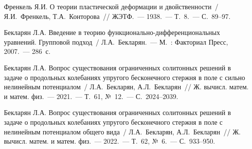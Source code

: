 \begin{thebibliography}{4} %
    
 Френкель Я.И. О теории пластической деформации и двойственности~/ Я.И.~Френкель, Т.А.~Конторова~// ЖЭТФ.~--- 1938.~--- Т.~8.~--- С.~89--97.

Бекларян Л.А. Введение в теорию функ\-ци\-о\-наль\-но-диф\-фе\-рен\-ци\-о\-наль\-ных уравнений. Групповой подход~/ Л.А.~Бекларян.~--- М.~: Факториал Пресс, 2007.~--- 286~с.

Бекларян Л.А. Вопрос существования ограниченных солитонных решений в задаче о продольных колебаниях упругого бесконечного стержня в поле с сильно нелинейным потенциалом~/ Л.А.~Бекларян, А.Л.~Бекларян~// Ж. вычисл. матем. и матем. физ.~--- 2021.~--- Т.~61, №~12.~--- С.~2024--2039.

Бекларян Л.А. Вопрос существования ограниченных солитонных решений в задаче о продольных колебаниях упругого бесконечного стержня в поле с нелинейным потенциалом общего вида~/ Л.А.~Бекларян, А.Л.~Бекларян~// Ж. вычисл. матем. и матем. физ.~--- 2022.~--- Т.~62, №~6.~--- С.~933--950.

\end{thebibliography}





%


